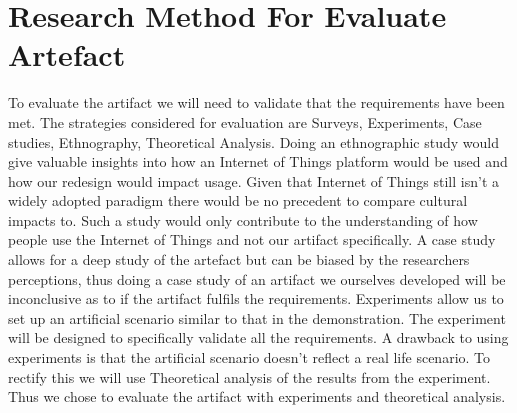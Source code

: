 \section{Research Method For Evaluate Artefact}
To evaluate the artifact we will need to validate that the requirements have been met. The strategies considered for evaluation are Surveys, Experiments, Case studies, Ethnography, Theoretical Analysis. 
Doing an ethnographic study would give valuable insights into how an Internet of Things platform would be used and how our redesign would impact usage. Given that Internet of Things still isn't a widely adopted paradigm there would be no precedent to compare cultural impacts to. Such a study would only contribute to the understanding of how people use the Internet of Things and not our artifact specifically.
A case study allows for a deep study of the artefact but can be biased by the researchers perceptions, thus doing a case study of an artifact we ourselves developed will be inconclusive as to if the artifact fulfils the requirements.
Experiments allow us to set up an artificial scenario similar to that in the demonstration. The experiment will be designed to specifically validate all the requirements. A drawback to using experiments is that the artificial scenario doesn't reflect a real life scenario. To rectify this we will use Theoretical analysis of the results from the experiment.
Thus we chose to evaluate the artifact with experiments and theoretical analysis.

